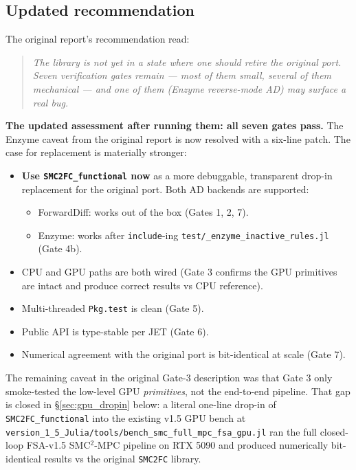 \documentclass[11pt,a4paper]{article}
\begin{document}
\subsection{Updated recommendation}

The original report's recommendation read:

\begin{quote}
\itshape The library is \emph{not yet} in a state where one should
retire the original port. Seven verification gates remain --- most of
them small, several of them mechanical --- and one of them (Enzyme
reverse-mode AD) may surface a real bug.
\end{quote}

\noindent \textbf{The updated assessment after running them: all seven
gates pass.} The Enzyme caveat from the original report is now
resolved with a six-line patch. The case for replacement is materially
stronger:

\begin{itemize}[leftmargin=*]
\item \textbf{Use \texttt{SMC2FC\_functional} now} as a more debuggable,
transparent drop-in replacement for the original port. Both AD backends
are supported:
    \begin{itemize}[leftmargin=*]
    \item ForwardDiff: works out of the box (Gates 1, 2, 7).
    \item Enzyme: works after \texttt{include}-ing
        \texttt{test/\_enzyme\_inactive\_rules.jl} (Gate 4b).
    \end{itemize}
\item CPU and GPU paths are both wired (Gate 3 confirms the GPU
primitives are intact and produce correct results vs CPU reference).
\item Multi-threaded \texttt{Pkg.test} is clean (Gate 5).
\item Public API is type-stable per JET (Gate 6).
\item Numerical agreement with the original port is bit-identical at
scale (Gate 7).
\end{itemize}

\noindent The remaining caveat in the original Gate-3 description was
that Gate 3 only smoke-tested the low-level GPU \emph{primitives}, not
the end-to-end pipeline. That gap is closed in
\S\ref{sec:gpu_dropin} below: a literal one-line drop-in of
\texttt{SMC2FC\_functional} into the existing v1.5 GPU bench at
\texttt{version\_1\_5\_Julia/tools/bench\_smc\_full\_mpc\_fsa\_gpu.jl}
ran the full closed-loop FSA-v1.5 SMC$^2$-MPC pipeline on RTX 5090 and
produced numerically bit-identical results vs the original
\texttt{SMC2FC} library.
\end{document}
